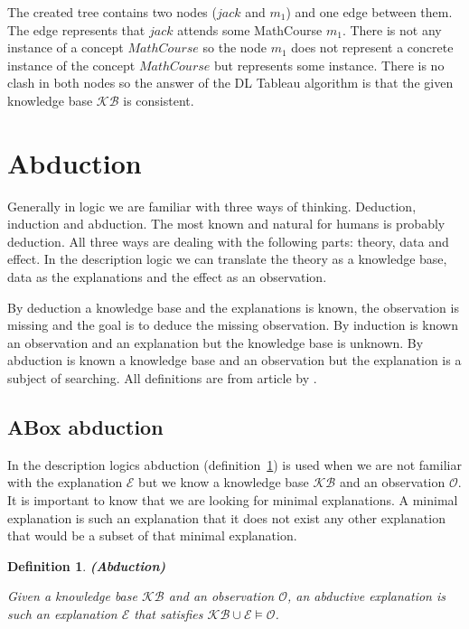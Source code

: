 \documentclass[12pt,a4paper]{article}
\newtheorem{definition}{Definition}[subsection]
\begin{document}
The created tree contains two nodes ($jack$ and $m_{1}$) and one edge between them. The edge represents that $jack$ attends some MathCourse $m_{1}$. There is not any instance of a concept $MathCourse$ so the node $m_{1}$ does not represent a concrete instance of the concept $MathCourse$ but represents some instance. There is no clash in both nodes so the answer of the DL Tableau algorithm is that the given knowledge base $\mathcal{KB}$ is consistent.

\section{Abduction}
Generally in logic we are familiar with three ways of thinking. Deduction, induction and abduction. The most known and natural for humans is probably deduction. All three ways are dealing with the following parts: theory, data and effect. In the description logic we can translate the theory as a knowledge base, data as the explanations and the effect as an observation.

By deduction a knowledge base and the explanations is known, the observation is missing and the goal is to deduce the missing observation. By induction is known an observation and an explanation but the knowledge base is unknown. By abduction is known a knowledge base and an observation but the explanation is a subject of searching. All definitions are from article by \cite{pukancovaAboxAbduction}.

\subsection{ABox abduction}
In the description logics abduction (definition~\ref{def:abduction}) is used when we are not familiar with the explanation $\mathcal{E}$ but we know a knowledge base $\mathcal{KB}$ and an observation $\mathcal{O}$. It is important to know that we are looking for minimal explanations. A minimal explanation is such an explanation that it does not exist any other explanation that would be a subset of that minimal explanation.

\begin{definition}{\textbf{(Abduction)}} 
	\label{def:abduction}
		
	Given a knowledge base $\mathcal{KB}$ and an observation $\mathcal{O}$, an abductive explanation is such an explanation $\mathcal{E}$ that satisfies $\mathcal{KB} \cup \mathcal{E} \models \mathcal{O}$.
\end{definition}
\end{document}
